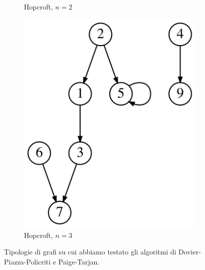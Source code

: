 \begin{figure}
\begin{subfigure}[b]{0.1\textwidth}
        \caption{Hopcroft, $n=2$}
        \label{fig:hopcroft_graph_1}
    \end{subfigure}
    \qquad \qquad
    \begin{subfigure}[b]{0.2\textwidth}
        \centering
        \includegraphics[width=\textwidth]{./sezione3/experimental_results/plots/hopcroft_graph_2.png}
        \caption{Hopcroft, $n=3$}
        \label{fig:hopcroft_graph_2}
    \end{subfigure}
    \caption{Tipologie di grafi su cui abbiamo testato gli algoritmi di Dovier-Piazza-Policriti e Paige-Tarjan.}
\end{figure}

